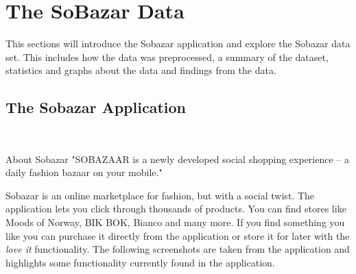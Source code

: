 
\chapter{The SoBazar Data}
\minitoc

    This sections will introduce the Sobazar application and explore the Sobazar data set.
    This includes how the data was preprocessed, a summary of the dataset, statistics and graphs about the data and findings from the data.

	
	\section{The Sobazar Application}\mbox{}\\
	
	\begin{chapquote}[30pt]{About Sobazar}
	  "SOBAZAAR is a newly developed social shopping experience – a daily fashion bazaar on your mobile."
	\end{chapquote}
	
	Sobazar is an online marketplace for fashion, but with a social twist. The application lets you click through thousands of products. You can find stores like Moods of Norway, BIK BOK, Bianco and many more. If you find something you like you can purchase it directly from the application or store it for later with the \emph{love it} functionality. 
	The following screenshots are taken from the application and highlights some functionality currently found in the
	application.
		
